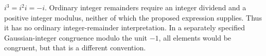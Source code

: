 $i^3=i^2i=\boxed{-i}$. Ordinary integer remainders require an integer dividend and a positive integer modulus, neither of which the proposed expression supplies. Thus it has no ordinary integer-remainder interpretation. In a separately specified Gaussian-integer congruence modulo the unit $-1$, all elements would be congruent, but that is a different convention.
